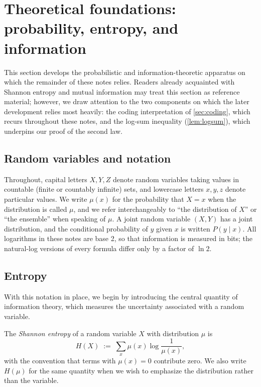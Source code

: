 \documentclass[11pt]{article}
\begin{document}
\section{Theoretical foundations: probability, entropy, and information}
\label{sec:prelim}

This section develops the probabilistic and information-theoretic apparatus on which the remainder of these notes relies. Readers already acquainted with Shannon entropy and mutual information may treat this section as reference material; however, we draw attention to the two components on which the later development relies most heavily: the coding interpretation of \cref{sec:coding}, which recurs throughout these notes, and the log-sum inequality (\cref{lem:logsum}), which underpins our proof of the second law.

\subsection{Random variables and notation}

Throughout, capital letters $X, Y, Z$ denote random variables taking values in countable (finite or countably infinite) sets, and lowercase letters $x, y, z$ denote particular values. We write $\mu(x)$ for the probability that $X = x$ when the distribution is called $\mu$, and we refer interchangeably to ``the distribution of $X$'' or ``the ensemble'' when speaking of $\mu$. A joint random variable $(X, Y)$ has a joint distribution, and the conditional probability of $y$ given $x$ is written $P(y \mid x)$. All logarithms in these notes are base 2, so that information is measured in bits; the natural-log versions of every formula differ only by a factor of $\ln 2$.

\subsection{Entropy}

With this notation in place, we begin by introducing the central quantity of information theory, which measures the uncertainty associated with a random variable.

\begin{definition}
\label{def:entropy}
The \emph{Shannon entropy} of a random variable $X$ with distribution $\mu$ is
\[
H(X) \;:=\; \sum_{x} \mu(x) \log \frac{1}{\mu(x)},
\]
with the convention that terms with $\mu(x) = 0$ contribute zero. We also write $H(\mu)$ for the same quantity when we wish to emphasize the distribution rather than the variable.
\end{definition}
\end{document}
